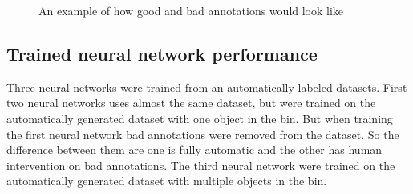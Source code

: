 \begin{figure}[h]
    \centering
    \hfill
    \caption{An example of how good and bad annotations would look like}
    \label{figure: goodandbad}
\end{figure}
\vspace{1cm}

\subsection{Trained neural network performance}



Three neural networks were trained from an automatically labeled datasets. 
First two neural networks uses almost the same dataset, but were trained on the automatically generated dataset with one object in the bin. But when training the first neural network bad annotations were removed from the dataset. 
So the difference between them are one is fully automatic and the other has human intervention on bad annotations.
The third neural network were trained on the automatically generated dataset with multiple objects in the bin.

